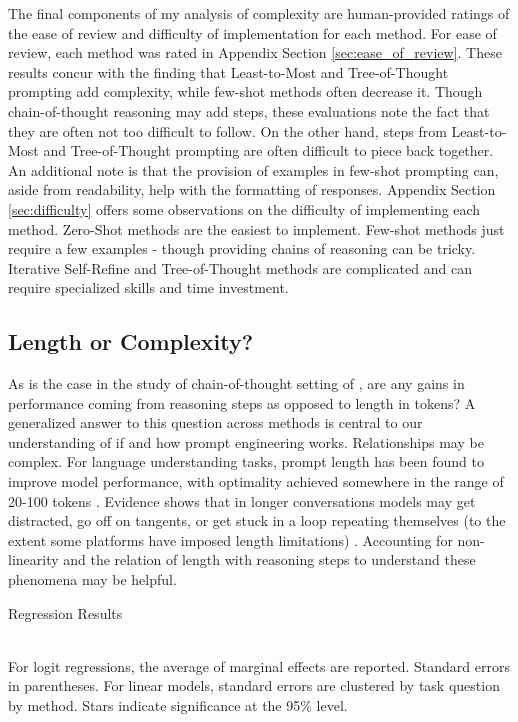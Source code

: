 \documentclass[11pt]{article}
\begin{document}
The final components of my analysis of complexity are human-provided ratings of the ease of review and difficulty of implementation for each method. For ease of review, each method was rated in Appendix Section \ref{sec:ease_of_review}. These results concur with the finding that Least-to-Most and Tree-of-Thought prompting add complexity, while few-shot methods often decrease it. Though chain-of-thought reasoning may add steps, these evaluations note the fact that they are often not too difficult to follow. On the other hand, steps from Least-to-Most and Tree-of-Thought prompting are often difficult to piece back together. An additional note is that the provision of examples in few-shot prompting can, aside from readability, help with the formatting of responses. Appendix Section \ref{sec:difficulty} offers some observations on the difficulty of implementing each method. Zero-Shot methods are the easiest to implement. Few-shot methods just require a few examples - though providing chains of reasoning can be tricky. Iterative Self-Refine and Tree-of-Thought methods are complicated and can require specialized skills and time investment.

\subsection*{Length or Complexity?}

As is the case in the study of chain-of-thought setting of \citealp{fu_complexity-based_2023}, are any gains in performance coming from reasoning steps as opposed to length in tokens? A generalized answer to this question across methods is central to our understanding of if and how prompt engineering works. Relationships may be complex. For language understanding tasks, prompt length has been found to improve model performance, with optimality achieved somewhere in the range of 20-100 tokens \cite{lester_power_2021}. Evidence shows that in longer conversations models may get distracted, go off on tangents, or get stuck in a loop repeating themselves (to the extent some platforms have imposed length limitations) \cite{shi_large_2023, mann_microsoft_nodate}. Accounting for non-linearity and the relation of length with reasoning steps to understand these phenomena may be helpful.

\begin{table}
  \caption{Regression Results}
  \centering
  \tiny
    
  \label{tab:regressions}
  \\[10pt] \footnotesize For logit regressions, the average of marginal effects are reported. Standard errors in parentheses. For linear models, standard errors are clustered by task question by method. Stars indicate significance at the 95\% level.
\end{table}
\end{document}
